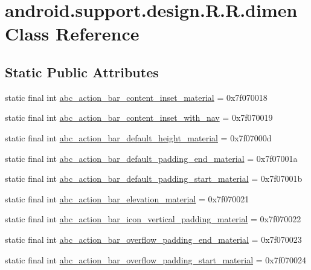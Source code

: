 \hypertarget{classandroid_1_1support_1_1design_1_1_r_1_1dimen}{
\section{android.support.design.R.R.dimen Class Reference}
\label{classandroid_1_1support_1_1design_1_1_r_1_1dimen}
}
\subsection*{Static Public Attributes}
\begin{CompactItemize}
\item 
static final int \hyperlink{classandroid_1_1support_1_1design_1_1_r_1_1dimen_cb02d39bdc089346b054965946b05972}{abc\_\-action\_\-bar\_\-content\_\-inset\_\-material} = 0x7f070018
\item 
static final int \hyperlink{classandroid_1_1support_1_1design_1_1_r_1_1dimen_93c1a1685b00b25e57f6a9d8d4a92125}{abc\_\-action\_\-bar\_\-content\_\-inset\_\-with\_\-nav} = 0x7f070019
\item 
static final int \hyperlink{classandroid_1_1support_1_1design_1_1_r_1_1dimen_f135d3d8063f9fa1aed01a661a8cb1b2}{abc\_\-action\_\-bar\_\-default\_\-height\_\-material} = 0x7f07000d
\item 
static final int \hyperlink{classandroid_1_1support_1_1design_1_1_r_1_1dimen_ac26174a9d85dceb1cf86c30d1e6d699}{abc\_\-action\_\-bar\_\-default\_\-padding\_\-end\_\-material} = 0x7f07001a
\item 
static final int \hyperlink{classandroid_1_1support_1_1design_1_1_r_1_1dimen_d49e8234dad2bb537541afb69a0b36ab}{abc\_\-action\_\-bar\_\-default\_\-padding\_\-start\_\-material} = 0x7f07001b
\item 
static final int \hyperlink{classandroid_1_1support_1_1design_1_1_r_1_1dimen_6eb307c5da32fec63199e72988c43ddf}{abc\_\-action\_\-bar\_\-elevation\_\-material} = 0x7f070021
\item 
static final int \hyperlink{classandroid_1_1support_1_1design_1_1_r_1_1dimen_5c994a0db66a5f410302bb24b17f8e16}{abc\_\-action\_\-bar\_\-icon\_\-vertical\_\-padding\_\-material} = 0x7f070022
\item 
static final int \hyperlink{classandroid_1_1support_1_1design_1_1_r_1_1dimen_604094e26ac8708e31b08d199143b5c3}{abc\_\-action\_\-bar\_\-overflow\_\-padding\_\-end\_\-material} = 0x7f070023
\item 
static final int \hyperlink{classandroid_1_1support_1_1design_1_1_r_1_1dimen_15de4d2c2ca6c8c1568d4cd36ec3df82}{abc\_\-action\_\-bar\_\-overflow\_\-padding\_\-start\_\-material} = 0x7f070024

\end{CompactItemize}
